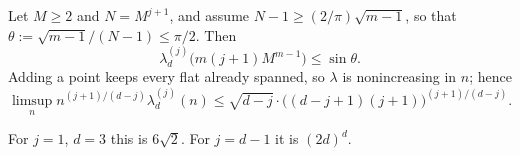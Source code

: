 \documentclass[11pt]{article}
\begin{document}
\begin{proposition}[Construction]\label{D:M3}
Let $M\ge2$ and $N=M^{j+1}$, and assume $N-1\ge(2/\pi)\sqrt{m-1}$, so that
$\theta:=\sqrt{m-1}/(N-1)\le\pi/2$. Then
\begin{equation*}
  \lambda_d^{(j)}\bigl(m(j+1)M^{m-1}\bigr)\le\sin\theta.
\end{equation*}
Adding a point keeps every flat already spanned, so $\lambda$ is nonincreasing in $n$; hence
\begin{equation*}
  \limsup_n n^{(j+1)/(d-j)}\lambda_d^{(j)}(n)\le\sqrt{d-j}\cdot\bigl((d-j+1)(j+1)\bigr)^{(j+1)/(d-j)}.
\end{equation*}
\end{proposition}

For $j=1$, $d=3$ this is $6\sqrt2$. For $j=d-1$ it is $(2d)^d$.
\end{document}
